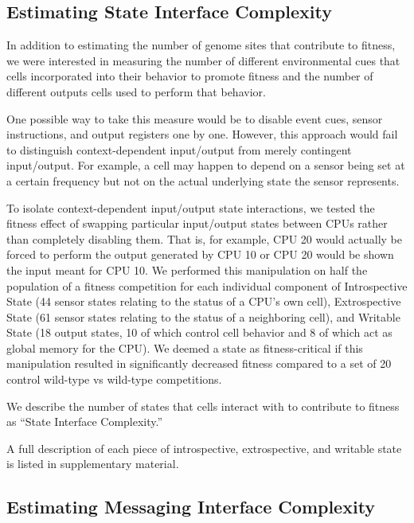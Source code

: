 
\subsection{Estimating State Interface Complexity}

In addition to estimating the number of genome sites that contribute to fitness, we were interested in measuring the number of different environmental cues that cells incorporated into their behavior to promote fitness and the number of different outputs cells used to perform that behavior.

One possible way to take this measure would be to disable event cues, sensor instructions, and output registers one by one.
However, this approach would fail to distinguish context-dependent input/output from merely contingent input/output.
For example, a cell may happen to depend on a sensor being set at a certain frequency but not on the actual underlying state the sensor represents.

To isolate context-dependent input/output state interactions, we tested the fitness effect of swapping particular input/output states between CPUs rather than completely disabling them.
That is, for example, CPU 20 would actually be forced to perform the output generated by CPU 10 or CPU 20 would be shown the input meant for CPU 10.
We performed this manipulation on half the population of a fitness competition for each individual component of Introspective State (44 sensor states relating to the status of a CPU's own cell), Extrospective State (61 sensor states relating to the status of a neighboring cell), and Writable State (18 output states, 10 of which control cell behavior and 8 of which act as global memory for the CPU).
We deemed a state as fitness-critical if this manipulation resulted in significantly decreased fitness compared to a set of 20 control wild-type vs wild-type competitions.

We describe the number of states that cells interact with to contribute to fitness as ``State Interface Complexity.''

A full description of each piece of introspective, extrospective, and writable state is listed in supplementary material.

\subsection{Estimating Messaging Interface Complexity}

